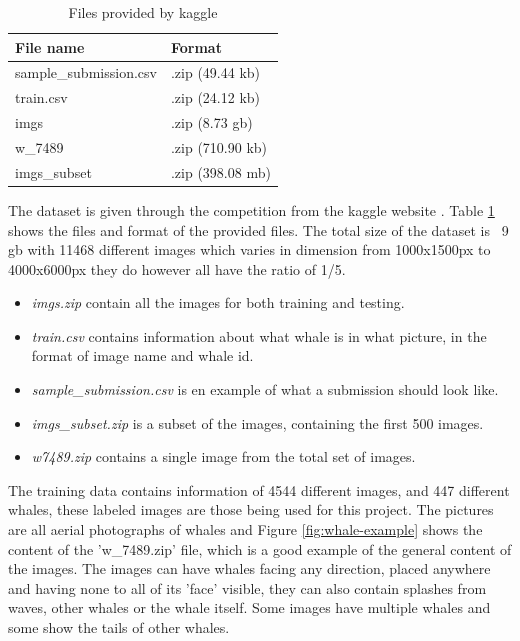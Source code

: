 \begin{table}
	\centering
	\caption{Files provided by kaggle}
	\label{table:dataset-files}
	\begin{tabular}{|l|l|}
		\hline
		File name              & Format           \\ \hline \hline
		sample\_submission.csv & .zip (49.44 kb)  \\ \hline
		train.csv              & .zip (24.12 kb)  \\ \hline
		imgs                   & .zip (8.73 gb)   \\ \hline
		w\_7489                & .zip (710.90 kb) \\ \hline
		imgs\_subset           & .zip (398.08 mb) \\ \hline
	\end{tabular}
\end{table}

The dataset is given through the competition from the kaggle website \cite{kaggle:competition}. Table \ref{table:dataset-files} shows the files and format of the provided files. The total size of the dataset is ~9 gb with 11468 different images which varies in dimension from 1000x1500px to 4000x6000px they do however all have the ratio of 1/5.

\begin{itemize}
	\item \emph{imgs.zip} contain all the images for both training and testing.
	\item \emph{train.csv} contains information about what whale is in what picture, in the format of image name and whale id.
	\item \emph{sample\_submission.csv} is en example of what a submission should look like.
	\item \emph{imgs\_subset.zip} is a subset of the images, containing the first 500 images.
	\item \emph{w\-7489.zip} contains a single image from the total set of images.
\end{itemize}

The training data contains information of 4544 different images, and 447 different whales, these labeled images are those being used for this project. The pictures are all aerial photographs of whales and Figure \ref{fig:whale-example} shows the content of the 'w\_7489.zip' file, which is a good example of the general content of the images. The images can have whales facing any direction, placed anywhere and having none to all of its 'face' visible, they can also contain splashes from waves, other whales or the whale itself. Some images have multiple whales and some show the tails of other whales.

